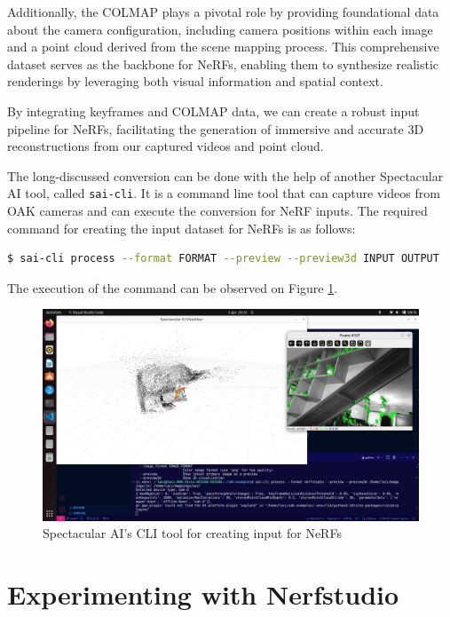 Additionally, the COLMAP plays a pivotal role by providing foundational data about the camera configuration, including camera positions within each image and a point cloud derived from the scene mapping process. This comprehensive dataset serves as the backbone for NeRFs, enabling them to synthesize realistic renderings by leveraging both visual information and spatial context.

By integrating keyframes and COLMAP data, we can create a robust input pipeline for NeRFs, facilitating the generation of immersive and accurate 3D reconstructions from our captured videos and point cloud.

The long-discussed conversion can be done with the help of another Spectacular AI tool, called \verb|sai-cli|. It is a command line tool that can capture videos from OAK cameras and can execute the conversion for NeRF inputs. The required command for creating the input dataset for NeRFs is as follows:

\FloatBarrier
\begin{lstlisting}[language=bash,frame=single,float=!ht]
$ sai-cli process --format FORMAT --preview --preview3d INPUT OUTPUT
\end{lstlisting}

The execution of the command can be observed on Figure \ref{fig:sai_cli_process}. 

\begin{figure}[htbp]
	\centering
	\includegraphics[width=150mm, keepaspectratio]{figures_jpg/sai-cli_process.jpg}
	\caption{Spectacular AI's CLI tool for creating input for NeRFs}
	\label{fig:sai_cli_process}
\end{figure}

\section{Experimenting with Nerfstudio}

